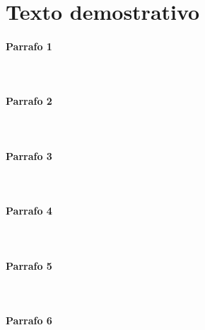 \documentclass[12pt,a4paper,oneside]{article}
\title{\titulodoc}
\author{\autordoc}
\date{\fechadoc}
\begin{document}
\titlepg %

\section{Texto demostrativo}
\paragraph{Parrafo 1}
\lipsum[1]\\
\paragraph{Parrafo 2}
\lipsum[2]\\
\paragraph{Parrafo 3}
\lipsum[3]\\
\paragraph{Parrafo 4}
\lipsum[4]\\
\paragraph{Parrafo 5}
\lipsum[5]\\
\paragraph{Parrafo 6}
\lipsum[6]\\
\end{document}
